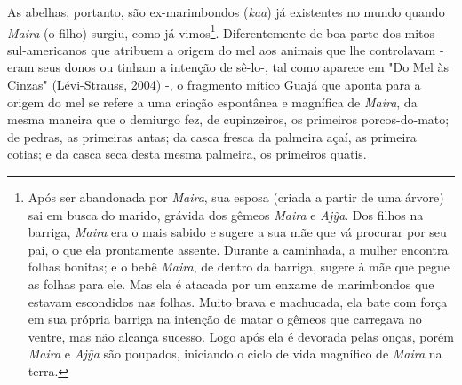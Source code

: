 As abelhas, portanto, são ex-marimbondos (\emph{kaa}) já existentes no
mundo quando \emph{Maira} (o filho) surgiu, como já vimos\footnote{Após
  ser abandonada por \emph{Maira}, sua esposa (criada a partir de uma
  árvore) sai em busca do marido, grávida dos gêmeos \emph{Maira} e
  \emph{Ajỹa}. Dos filhos na barriga, \emph{Maira} era o mais sabido e
  sugere a sua mãe que vá procurar por seu pai, o que ela prontamente
  assente. Durante a caminhada, a mulher encontra folhas bonitas; e o
  bebê \emph{Maira}, de dentro da barriga, sugere à mãe que pegue as
  folhas para ele. Mas ela é atacada por um enxame de marimbondos que
  estavam escondidos nas folhas. Muito brava e machucada, ela bate com
  força em sua própria barriga na intenção de matar o gêmeos que
  carregava no ventre, mas não alcança sucesso. Logo após ela é devorada
  pelas onças, porém \emph{Maira} e \emph{Ajỹa} são poupados, iniciando
  o ciclo de vida magnífico de \emph{Maira} na terra.}. Diferentemente
de boa parte dos mitos sul-americanos que atribuem a origem do mel aos
animais que lhe controlavam - eram seus donos ou tinham a intenção de
sê-lo-, tal como aparece em "Do Mel às Cinzas" (Lévi-Strauss, 2004) -, o
fragmento mítico Guajá que aponta para a origem do mel se refere a uma
criação espontânea e magnífica de \emph{Maira}, da mesma maneira que o
demiurgo fez, de cupinzeiros, os primeiros porcos-do-mato; de pedras, as
primeiras antas; da casca fresca da palmeira açaí, as primeira cotias; e
da casca seca desta mesma palmeira, os primeiros quatis.


